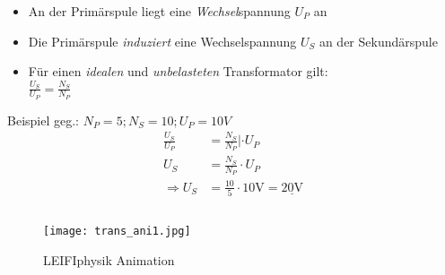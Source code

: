\begin{frame}
    \makeframetitle
    \begin{itemize}
        \item An der Primärspule liegt eine \textit{Wechsel}spannung $U_P$ an
        \item Die Primärspule \textit{induziert} eine Wechselspannung $U_S$ an
            der Sekundärspule
        \item Für einen \textit{idealen} und \textit{unbelasteten}
            Transformator gilt: \\
            $\frac{U_S}{U_P} = \frac{N_S}{N_P}$
    \end{itemize}
    \pause
    \begin{exampleblock}{Beispiel}
        geg.: $N_P = 5; N_S=10; U_P = 10V$
        \pause
        \begin{align}
            \frac{U_S}{U_P} &= \frac{N_S}{N_P} | \cdot U_P \\
            U_S &= \frac{N_S}{N_P} \cdot U_P \\ 
            \Rightarrow U_S &= \frac{10}{5} \cdot 10\unit\volt =
            \underline{20\unit\volt}
        \end{align}
    \end{exampleblock}
\end{frame}

\begin{frame}
\makeframetitle
\begin{figure}
    \begin{columns}
        \begin{center}
            \texttt{[image: trans\_ani1.jpg]}
        \end{center}
        \caption{LEIFIphysik Animation\cite{leifi_trans_ani1}}
    \end{columns}
\end{figure}
\end{frame}

